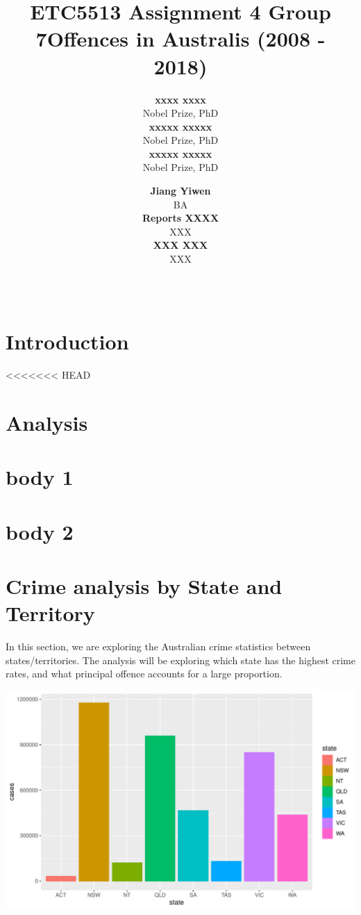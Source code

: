 \documentclass[11pt,a4paper,]{article}
\title{ETC5513 Assignment 4 Group 7}
\title{Offences in Australis (2008 - 2018)}
\author{\sf\Large\textbf{ xxxx xxxx}\\ {\sf\large Nobel Prize, PhD\\[0.5cm]} \sf\Large\textbf{ xxxxx xxxxx}\\ {\sf\large Nobel Prize, PhD\\[0.5cm]} \sf\Large\textbf{ xxxxx xxxxx}\\ {\sf\large Nobel Prize, PhD\\[0.5cm]}}
\date{\sf\Date~\Month~\Year}
\author{\sf\Large\textbf{ Jiang Yiwen}\\ {\sf\large BA\\[0.5cm]} \sf\Large\textbf{ Reports XXXX}\\ {\sf\large XXX\\[0.5cm]} \sf\Large\textbf{ XXX XXX}\\ {\sf\large XXX\\[0.5cm]}}
\date{\sf\Date~\Month~\Year}
\makeatletter
\def\titlepage{\front{\expandafter{\@title}}{\@author}{\@organization}}
\let\origfigure\figure
\let\endorigfigure\endfigure
\renewenvironment{figure}[1][2] {
\expandafter\origfigure\expandafter[H]
} {
\endorigfigure
}
\makeatother
\begin{document}
\titlepage

\hypertarget{introduction}{%
\section{Introduction}\label{introduction}}

<<<<<<< HEAD
\hypertarget{analysis}{%
\section{Analysis}\label{analysis}}

\section*{body 1}

\section*{body 2}

\section*{Crime analysis by State and Territory}

In this section, we are exploring the Australian crime statistics between states/territories. The analysis will be exploring which state has the highest crime rates, and what principal offence accounts for a large proportion.

\begin{figure}
\centering
\includegraphics{ETC5513-Assignment4_files/figure-latex/graph1-1.pdf}
\caption{\label{fig:graph1}state-crime}
\end{figure}
\end{document}
